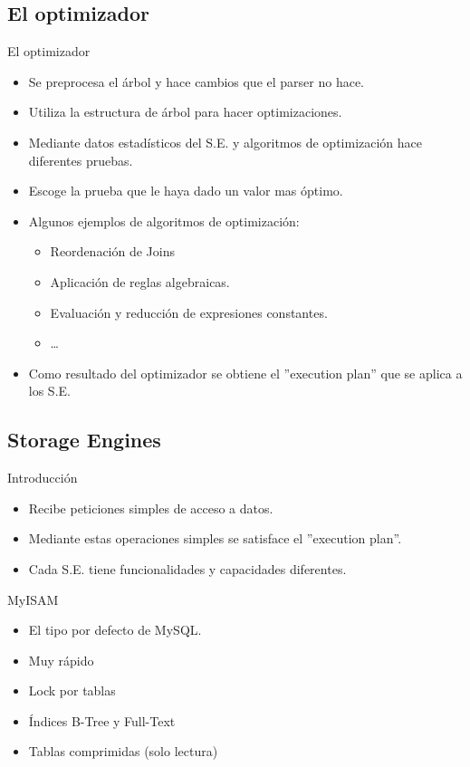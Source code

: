 \subsection{El optimizador}
\begin{frame}{El optimizador}
  \begin{itemize}
    \item Se preprocesa el árbol y hace cambios que el parser no hace.
    \item Utiliza la estructura de árbol para hacer optimizaciones.
    \item Mediante datos estadísticos del S.E. y algoritmos de optimización hace diferentes pruebas.
    \item Escoge la prueba que le haya dado un valor mas óptimo.
    \item Algunos ejemplos de algoritmos de optimización:
    \begin{itemize}
      \item Reordenación de Joins
      \item Aplicación de reglas algebraicas.
      \item Evaluación y reducción de expresiones constantes.
      \item \dots
    \end{itemize}
    \item Como resultado del optimizador se obtiene el ''execution plan'' que se aplica a los S.E.
  \end{itemize}
\end{frame}

\subsection{Storage Engines}
\begin{frame}{Introducción}
  \begin{itemize}
    \item Recibe peticiones simples de acceso a datos.
    \item Mediante estas operaciones simples se satisface el ''execution plan''.
    \item Cada S.E. tiene funcionalidades y capacidades diferentes.
  \end{itemize}
\end{frame}

\begin{frame}{MyISAM}
  \begin{itemize}
    \item El tipo por defecto de MySQL.
    \item Muy rápido
    \item Lock por tablas
    \item Índices B-Tree y Full-Text
    \item Tablas comprimidas (solo lectura)
  \end{itemize}
\end{frame}

